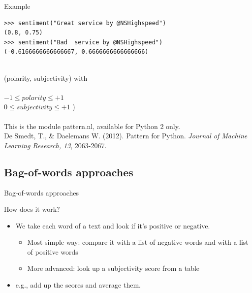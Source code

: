 \documentclass{beamer}
\begin{document}
\begin{frame}[fragile]{Example}
\begin{lstlisting}
>>> sentiment("Great service by @NSHighspeed")
(0.8, 0.75)
>>> sentiment("Bad  service by @NSHighspeed")
(-0.6166666666666667, 0.6666666666666666)
\end{lstlisting}
	~\\
	\footnotesize{(polarity, subjectivity) with \\ ~ \\
		$-1 \leq polarity \leq +1$\\
		$0 \leq subjectivity \leq +1$ )} \\~\\
	\tiny{This is the module pattern.nl, available for Python 2 only. \\ De Smedt, T., \& Daelemans W. (2012).  Pattern for Python. \emph{Journal of Machine Learning Research, 13}, 2063-2067.\\}
\end{frame}

\subsection{Bag-of-words approaches}

\begin{frame}{Bag-of-words approaches}
	\begin{block}{How does it work?}
		\begin{itemize}
			\item We take each word of a text and look if it's positive or negative.
			\begin{itemize}
				\item<2-> Most simple way: compare it with a list of negative words and with a list of positive words %
				\item<3-> More advanced: look up a subjectivity score from a table 
			\end{itemize}
			\item<4-> e.g., add up the scores and average them.
		\end{itemize}
	\end{block}
\end{frame}

%
\end{document}
